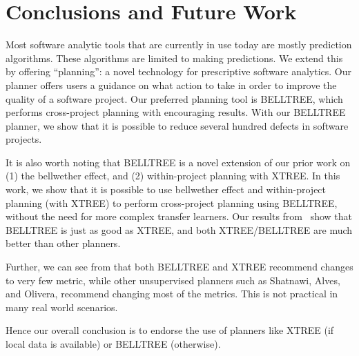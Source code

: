 \section{Conclusions and Future Work}
\label{sect:future}

Most software analytic tools that are currently in use today are mostly prediction algorithms. These algorithms are limited to making predictions. We extend this by offering ``planning'': a novel technology for prescriptive software analytics. Our planner offers users a guidance on what action to take in order to improve the quality of a software project. Our preferred planning tool is BELLTREE, which performs cross-project planning with encouraging results. With our BELLTREE planner, we show that it is possible to reduce several hundred defects in software projects. 

It is also worth noting that BELLTREE is a novel extension of our prior work on (1) the bellwether effect, and (2) within-project planning with XTREE. In this work, we show that it is possible to use bellwether effect and within-project planning (with XTREE) to perform cross-project planning using BELLTREE, without the need for more complex transfer learners. Our results from~ show that BELLTREE is just as good as XTREE, and both XTREE/BELLTREE are much better than other planners. 

Further, we can see from  that both BELLTREE and XTREE recommend changes to very few metric, while other unsupervised planners such as Shatnawi, Alves, and Olivera, recommend changing most of the metrics. This is not practical in many real world scenarios.


Hence our overall conclusion is to endorse the use of planners like XTREE (if local data is available) or BELLTREE (otherwise).





